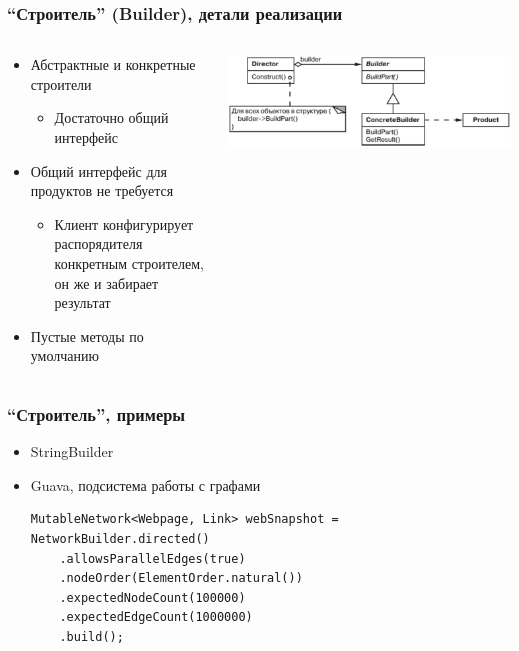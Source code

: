 \documentclass[xetex,mathserif,serif]{beamer}
\begin{document}
	\begin{frame}
		\frametitle{``Строитель'' (Builder), детали реализации}
		\begin{columns}
			\begin{column}{0.5\textwidth}
				\begin{itemize}
					\item Абстрактные и конкретные строители
					\begin{itemize}
						\item Достаточно общий интерфейс
					\end{itemize}
					\item Общий интерфейс для продуктов не требуется
					\begin{itemize}
						\item Клиент конфигурирует распорядителя конкретным строителем, он же и забирает результат
					\end{itemize}
					\item Пустые методы по умолчанию
				\end{itemize}
			\end{column}
			\begin{column}{0.5\textwidth}
				\begin{center}
					\includegraphics[width=\textwidth]{builder.png}
				\end{center}
			\end{column}
		\end{columns}
	\end{frame}

	\begin{frame}[fragile]
		\frametitle{``Строитель'', примеры}
		\begin{itemize}
			\item StringBuilder
			\item Guava, подсистема работы с графами
			\begin{verbatim}
MutableNetwork<Webpage, Link> webSnapshot = NetworkBuilder.directed()
    .allowsParallelEdges(true)
    .nodeOrder(ElementOrder.natural())
    .expectedNodeCount(100000)
    .expectedEdgeCount(1000000)
    .build();
			\end{verbatim}
		\end{itemize}
\end{frame}
\end{document}
